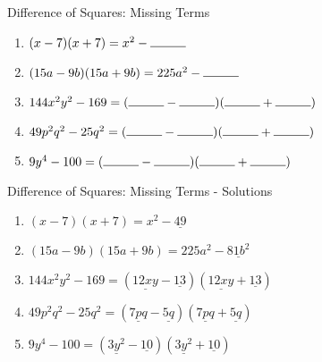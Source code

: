\documentclass[aspectratio=169]{beamer}
\begin{document}
\begin{frame}{Difference of Squares: Missing Terms}
    \begin{tcolorbox}[colback=lightgray,colframe=primary,title=Indicate the Missing Terms]
        \footnotesize
        \begin{enumerate}
            \setlength{\itemsep}{0.5em}
            \item $(x - 7)(x + 7) = x^2 - \rule{1cm}{0.15mm}$
            \item $(15a - 9b)(15a + 9b) = 225a^2 - \rule{1cm}{0.15mm}$
            \item $144x^2y^2 - 169 = (\rule{1cm}{0.15mm} - \rule{1cm}{0.15mm})(\rule{1cm}{0.15mm} + \rule{1cm}{0.15mm})$
            \item $49p^2q^2 - 25q^2 = (\rule{1cm}{0.15mm} - \rule{1cm}{0.15mm})(\rule{1cm}{0.15mm} + \rule{1cm}{0.15mm})$
            \item $9y^4 - 100 = (\rule{1cm}{0.15mm} - \rule{1cm}{0.15mm})(\rule{1cm}{0.15mm} + \rule{1cm}{0.15mm})$
        \end{enumerate}
    \end{tcolorbox}
\end{frame}

\begin{frame}{Difference of Squares: Missing Terms - Solutions}
    \begin{tcolorbox}[colback=lightgray,colframe=accent,title=Detailed Solutions]
        \footnotesize
        \begin{enumerate}
            \setlength{\itemsep}{0.5em}
            \item $(x - 7)(x + 7) = x^2 - \underline{49}$
            \item $(15a - 9b)(15a + 9b) = 225a^2 - \underline{81b^2}$
            \item $144x^2y^2 - 169 = (\underline{12xy} - \underline{13})(\underline{12xy} + \underline{13})$
            \item $49p^2q^2 - 25q^2 = (\underline{7pq} - \underline{5q})(\underline{7pq} + \underline{5q})$
            \item $9y^4 - 100 = (\underline{3y^2} - \underline{10})(\underline{3y^2} + \underline{10})$
        \end{enumerate}
    \end{tcolorbox}
\end{frame}
\end{document}
